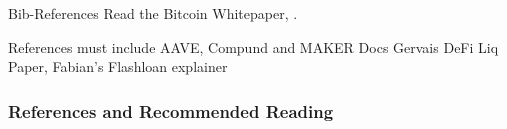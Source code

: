 \documentclass[handout]{beamer}
\begin{document}
\begin{frame}{Bib-References}
		Read the Bitcoin Whitepaper, \cite{nakamotoBitcoin2008}.
\end{frame}

\begin{frame}%

References must include AAVE, Compund and MAKER Docs
Gervais DeFi Liq Paper, Fabian's Flashloan explainer

\frametitle{References and Recommended Reading}
	
	
\end{frame}
\end{document}
